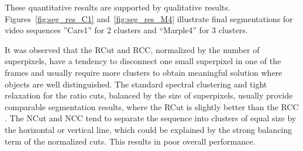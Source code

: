 These quantitative results are supported by qualitative results. Figures~\ref{fig:seg_res_C1} and~\ref{fig:seg_res_M4} illustrate final segmentations for video sequences ''Cars1'' for 2 clusters and ``Marple4'' for 3 clusters.

It was observed that the RCut and RCC, normalized by the number of superpixels, have a tendency to disconnect one small superpixel in one of the frames and usually require more clusters
to obtain meaningful solution where objects are well distinguished. 
The standard spectral clustering and tight relaxation for the ratio cuts, balanced by the size of superpixels, usually provide comparable segmentation results, where the RCut is slightly better than the RCC . 
The NCut and NCC tend to separate the sequence into clusters of equal size by the horizontal or vertical line, which could be explained by the strong balancing term of the normalized cuts. This results in poor 
overall performance.
